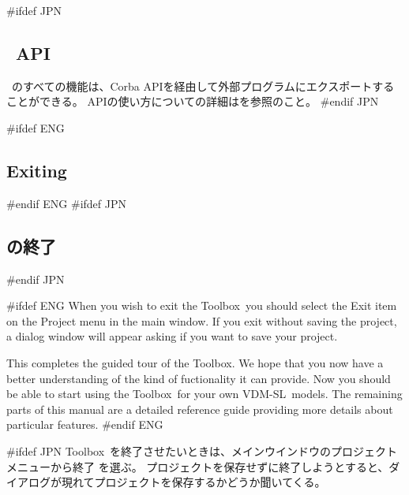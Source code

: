 \documentclass[\pformat,12pt]{article}
\newcommand{\vdmslpp}{VDM-SL}
\newcommand{\Toolbox}{Toolbox}
\newcommand{\vdmslpp}{VDM++}
\newcommand{\Toolbox}{Toolbox}
\newcommand{\guicmd}[1]{{\sf #1}}
\newcommand{\guicmd}[1]{{\gt #1}}
\begin{document}
#ifdef JPN
\subsection{\protect\VDMTools\ API}

\VDMTools\ のすべての機能は、Corba APIを経由して外部プログラムにエクスポートすることができる。
APIの使い方についての詳細は\cite{APIMan-CSK}を参照のこと。
#endif JPN



#ifdef ENG
\subsection{Exiting \protect\VDMTools}
#endif ENG
#ifdef JPN
\subsection{\protect\VDMTools の終了}
#endif JPN

#ifdef ENG
When you wish to exit the \Toolbox\ you should select the
\guicmd{Exit} item on the \guicmd{Project} menu in
the main window. If you exit without saving the project, a dialog
window will appear asking if you want to save your project.

This completes the guided tour of the \Toolbox. We hope that you now have
a better understanding of the kind of fuctionality it can provide. Now
you should be able to start using the \Toolbox\ for your own
\vdmslpp\ models. The remaining parts of this manual are a detailed
reference guide providing more details about particular features.
#endif ENG

#ifdef JPN
\Toolbox\ を終了させたいときは、メインウインドウの\guicmd{プロジェクト} メニューから\guicmd{終了} を選ぶ。
プロジェクトを保存せずに終了しようとすると、ダイアログが現れてプロジェクトを保存するかどうか聞いてくる。
\end{document}
